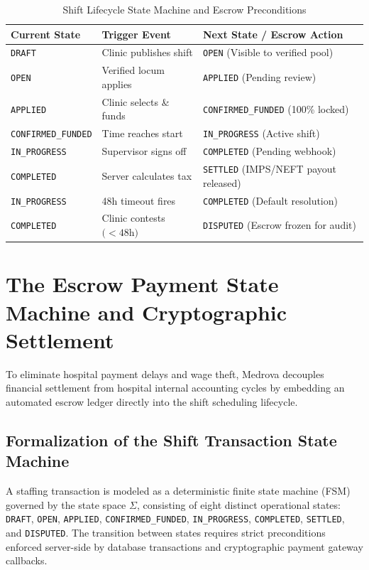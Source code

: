 \documentclass[conference]{IEEEtran}
\begin{document}
\begin{table}[t]
\caption{Shift Lifecycle State Machine and Escrow Preconditions}
\begin{center}
\begin{tabular}{p{3.5cm} p{4.5cm} p{8.5cm}}
\toprule
\textbf{Current State} & \textbf{Trigger Event} & \textbf{Next State / Escrow Action} \\
\midrule
\texttt{DRAFT} & Clinic publishes shift & \texttt{OPEN} (Visible to verified pool) \\
\texttt{OPEN} & Verified locum applies & \texttt{APPLIED} (Pending review) \\
\texttt{APPLIED} & Clinic selects \& funds & \texttt{CONFIRMED\_FUNDED} (100\% locked) \\
\texttt{CONFIRMED\_FUNDED} & Time reaches start & \texttt{IN\_PROGRESS} (Active shift) \\
\texttt{IN\_PROGRESS} & Supervisor signs off & \texttt{COMPLETED} (Pending webhook) \\
\texttt{COMPLETED} & Server calculates tax & \texttt{SETTLED} (IMPS/NEFT payout released) \\
\texttt{IN\_PROGRESS} & 48h timeout fires & \texttt{COMPLETED} (Default resolution) \\
\texttt{COMPLETED} & Clinic contests $(<48$h$)$ & \texttt{DISPUTED} (Escrow frozen for audit) \\
\bottomrule
\end{tabular}
\label{tab:state_machine}
\end{center}
\end{table}

\section{The Escrow Payment State Machine and Cryptographic Settlement}
To eliminate hospital payment delays and wage theft, Medrova decouples financial settlement from hospital internal accounting cycles by embedding an automated escrow ledger directly into the shift scheduling lifecycle.

\subsection{Formalization of the Shift Transaction State Machine}
A staffing transaction is modeled as a deterministic finite state machine (FSM) governed by the state space $\Sigma$, consisting of eight distinct operational states: \texttt{DRAFT}, \texttt{OPEN}, \texttt{APPLIED}, \texttt{CONFIRMED\_FUNDED}, \texttt{IN\_PROGRESS}, \texttt{COMPLETED}, \texttt{SETTLED}, and \texttt{DISPUTED}. The transition between states requires strict preconditions enforced server-side by database transactions and cryptographic payment gateway callbacks.
\end{document}
